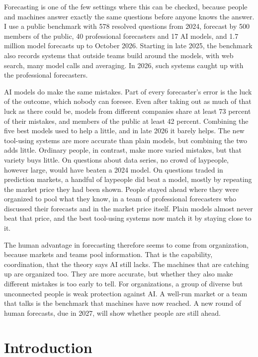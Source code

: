 \documentclass[11pt,a4paper]{article}
\theoremstyle{definition}
\begin{document}
Forecasting is one of the few settings where this can be checked, because people and machines answer exactly the same questions before anyone knows the answer. I use a public benchmark with 578 resolved questions from 2024, forecast by 500 members of the public, 40 professional forecasters and 17 AI models, and 1.7 million model forecasts up to October 2026. Starting in late 2025, the benchmark also records systems that outside teams build around the models, with web search, many model calls and averaging. In 2026, such systems caught up with the professional forecasters.

AI models do make the same mistakes. Part of every forecaster's error is the luck of the outcome, which nobody can foresee. Even after taking out as much of that luck as there could be, models from different companies share at least 73 percent of their mistakes, and members of the public at least 42 percent. Combining the five best models used to help a little, and in late 2026 it barely helps. The new tool-using systems are more accurate than plain models, but combining the two adds little. Ordinary people, in contrast, make more varied mistakes, but that variety buys little. On questions about data series, no crowd of laypeople, however large, would have beaten a 2024 model. On questions traded in prediction markets, a handful of laypeople did beat a model, mostly by repeating the market price they had been shown. People stayed ahead where they were organized to pool what they know, in a team of professional forecasters who discussed their forecasts and in the market price itself. Plain models almost never beat that price, and the best tool-using systems now match it by staying close to it.

The human advantage in forecasting therefore seems to come from organization, because markets and teams pool information. That is the capability, coordination, that the theory says AI still lacks. The machines that are catching up are organized too. They are more accurate, but whether they also make different mistakes is too early to tell. For organizations, a group of diverse but unconnected people is weak protection against AI. A well-run market or a team that talks is the benchmark that machines have now reached. A new round of human forecasts, due in 2027, will show whether people are still ahead.

\newpage
\setcounter{page}{1}

\section{Introduction}\label{sec:intro}
\end{document}
